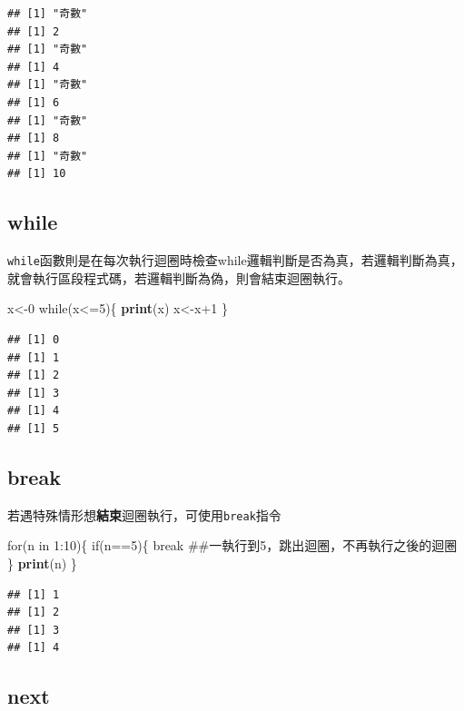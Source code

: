 \documentclass[]{book}
\newenvironment{Shaded}{\begin{snugshade}}{\end{snugshade}}
\newcommand{\KeywordTok}[1]{\textcolor[rgb]{0.13,0.29,0.53}{\textbf{{#1}}}}
\newcommand{\DecValTok}[1]{\textcolor[rgb]{0.00,0.00,0.81}{{#1}}}
\newcommand{\NormalTok}[1]{{#1}}
\theoremstyle{definition}
\theoremstyle{definition}
\theoremstyle{remark}
\begin{document}
\begin{verbatim}
## [1] "奇數"
## [1] 2
## [1] "奇數"
## [1] 4
## [1] "奇數"
## [1] 6
## [1] "奇數"
## [1] 8
## [1] "奇數"
## [1] 10
\end{verbatim}

\subsection{while}\label{while}

\texttt{while}函數則是在每次執行迴圈時檢查while邏輯判斷是否為真，若邏輯判斷為真，就會執行區段程式碼，若邏輯判斷為偽，則會結束迴圈執行。

\begin{Shaded}
\begin{Highlighting}[]
\NormalTok{x<-}\DecValTok{0}
\NormalTok{while(x<=}\DecValTok{5}\NormalTok{)\{}
  \KeywordTok{print}\NormalTok{(x)}
  \NormalTok{x<-x}\DecValTok{+1}
\NormalTok{\}}
\end{Highlighting}
\end{Shaded}

\begin{verbatim}
## [1] 0
## [1] 1
## [1] 2
## [1] 3
## [1] 4
## [1] 5
\end{verbatim}

\subsection{break}\label{break}

若遇特殊情形想\textbf{結束}迴圈執行，可使用\texttt{break}指令

\begin{Shaded}
\begin{Highlighting}[]
\NormalTok{for(n in }\DecValTok{1}\NormalTok{:}\DecValTok{10}\NormalTok{)\{}
  \NormalTok{if(n==}\DecValTok{5}\NormalTok{)\{}
    \NormalTok{break ##一執行到5，跳出迴圈，不再執行之後的迴圈}
  \NormalTok{\}}
  \KeywordTok{print}\NormalTok{(n)}
\NormalTok{\}}
\end{Highlighting}
\end{Shaded}

\begin{verbatim}
## [1] 1
## [1] 2
## [1] 3
## [1] 4
\end{verbatim}

\subsection{next}\label{next}
\end{document}
